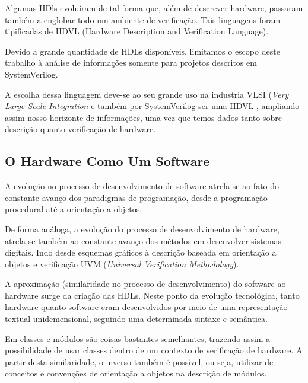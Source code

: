 \documentclass[12pt, twocolumn, a4paper]{article}
\begin{document}
Algumas HDls evoluíram de tal forma que, além de descrever hardware, passaram também a englobar todo um ambiente de verificação. Tais linguagens foram tipificadas de HDVL (Hardware Description and Verification Language).

Devido a grande quantidade de HDLs disponíveis, limitamos o escopo deste trabalho à análise de informações somente para projetos descritos em SystemVerilog.

A escolha dessa linguagem deve-se ao seu grande uso na industria VLSI (\textit{Very Large Scale Integration} \cite{Kumar2014} e também por SystemVerilog ser uma HDVL \cite{IEEEComputerSociety2013}, ampliando assim nosso horizonte de informações, uma vez que temos dados tanto sobre descrição quanto verificação de hardware.


	\subsection{O Hardware Como Um Software}
\quad A evolução no processo de desenvolvimento de software atrela-se ao fato do constante avanço dos paradigmas de programação, desde a programação procedural até a orientação a objetos.

De forma análoga, a evolução do processo de desenvolvimento de hardware, atrela-se também ao constante avanço dos métodos em desenvolver sistemas digitais. Indo desde esquemas gráficos à descrição baseada em orientação a objetos e verificação UVM (\textit{Universal Verification Methodology}).

A aproximação (similaridade no processo de desenvolvimento) do software ao hardware surge da criação das HDLs. Neste ponto da evolução tecnológica, tanto hardware quanto software eram desenvolvidos por meio de uma representação textual unidemensional, seguindo uma determinada sintaxe e semântica.

Em \cite{Hahanov2008} classes e módulos são coisas bastantes semelhantes, trazendo assim a possibilidade de usar classes dentro de um contexto de verificação de hardware. A partir desta similaridade, o inverso também é possível, ou seja, utilizar de conceitos e convenções de orientação a objetos na descrição de módulos.
\end{document}

